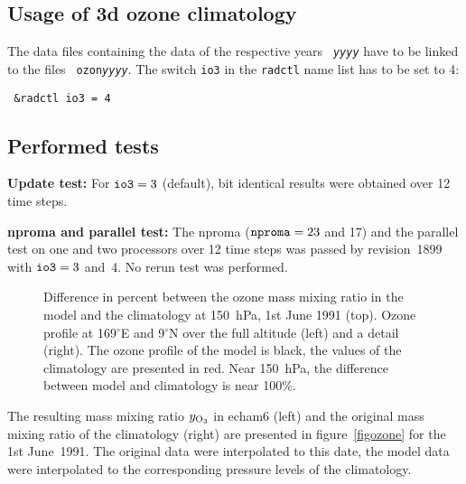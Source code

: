 \begin{appendix}
\subsection{Usage of 3d ozone climatology}

The data files containing the data of the respective years {\tt\it
  yyyy} have to be linked to the files {\tt 
  ozon{\it yyyy}}. The switch {\tt io3} in the {\tt radctl} name list
has to be set to 4:

{\tt 
\&radctl\newline
io3 = 4
}



\subsection{Performed tests}

{\bf Update test:} For ${\tt io3}=3$ (default), bit identical results were
obtained over 12 time 
steps.

{\bf nproma and parallel test:} The nproma (${\tt nproma}=23$ and 17)
and the parallel test on one and two 
processors over 12 time steps was passed by revision~1899 with ${\tt
  io3}=3$ and~4. No rerun test was 
performed.

\begin{figure}[ht]
\vspace{-5cm}
\pctthreetop
{\vspace{-2.7cm}}
{}
{}
\caption{Difference in percent between the ozone mass mixing ratio in
  the model and the climatology at 150~hPa, 1st June 1991
  (top). Ozone profile at 169$^\circ$E and 9$^\circ$N over the full
  altitude (left) and a detail (right). The ozone profile of the model
  is black, the values of the climatology are presented in red. Near
  150~hPa, the difference 
  between model and climatology is near 100\%.}\label{figdiff}
\end{figure}



The resulting mass mixing ratio $y_{\rm O_3}$ in echam6 (left) and the
original mass 
mixing ratio of the climatology (right) are presented in
figure~\ref{figozone} for the 
1st June~1991. The original data were interpolated to this date, the
model data were interpolated to 
the corresponding pressure levels of the climatology. 


\end{appendix}
